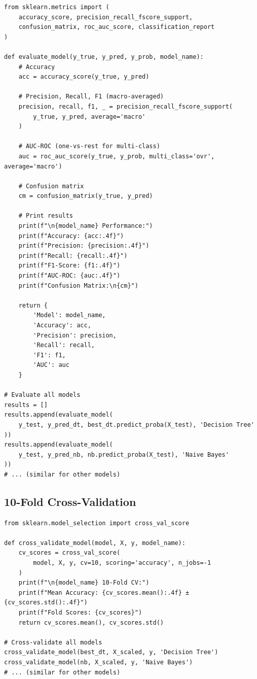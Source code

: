 \begin{verbatim}
from sklearn.metrics import (
    accuracy_score, precision_recall_fscore_support,
    confusion_matrix, roc_auc_score, classification_report
)

def evaluate_model(y_true, y_pred, y_prob, model_name):
    # Accuracy
    acc = accuracy_score(y_true, y_pred)
    
    # Precision, Recall, F1 (macro-averaged)
    precision, recall, f1, _ = precision_recall_fscore_support(
        y_true, y_pred, average='macro'
    )
    
    # AUC-ROC (one-vs-rest for multi-class)
    auc = roc_auc_score(y_true, y_prob, multi_class='ovr', average='macro')
    
    # Confusion matrix
    cm = confusion_matrix(y_true, y_pred)
    
    # Print results
    print(f"\n{model_name} Performance:")
    print(f"Accuracy: {acc:.4f}")
    print(f"Precision: {precision:.4f}")
    print(f"Recall: {recall:.4f}")
    print(f"F1-Score: {f1:.4f}")
    print(f"AUC-ROC: {auc:.4f}")
    print(f"Confusion Matrix:\n{cm}")
    
    return {
        'Model': model_name,
        'Accuracy': acc,
        'Precision': precision,
        'Recall': recall,
        'F1': f1,
        'AUC': auc
    }

# Evaluate all models
results = []
results.append(evaluate_model(
    y_test, y_pred_dt, best_dt.predict_proba(X_test), 'Decision Tree'
))
results.append(evaluate_model(
    y_test, y_pred_nb, nb.predict_proba(X_test), 'Naive Bayes'
))
# ... (similar for other models)
\end{verbatim}

\subsection{10-Fold Cross-Validation}

\begin{verbatim}
from sklearn.model_selection import cross_val_score

def cross_validate_model(model, X, y, model_name):
    cv_scores = cross_val_score(
        model, X, y, cv=10, scoring='accuracy', n_jobs=-1
    )
    print(f"\n{model_name} 10-Fold CV:")
    print(f"Mean Accuracy: {cv_scores.mean():.4f} ± {cv_scores.std():.4f}")
    print(f"Fold Scores: {cv_scores}")
    return cv_scores.mean(), cv_scores.std()

# Cross-validate all models
cross_validate_model(best_dt, X_scaled, y, 'Decision Tree')
cross_validate_model(nb, X_scaled, y, 'Naive Bayes')
# ... (similar for other models)
\end{verbatim}

